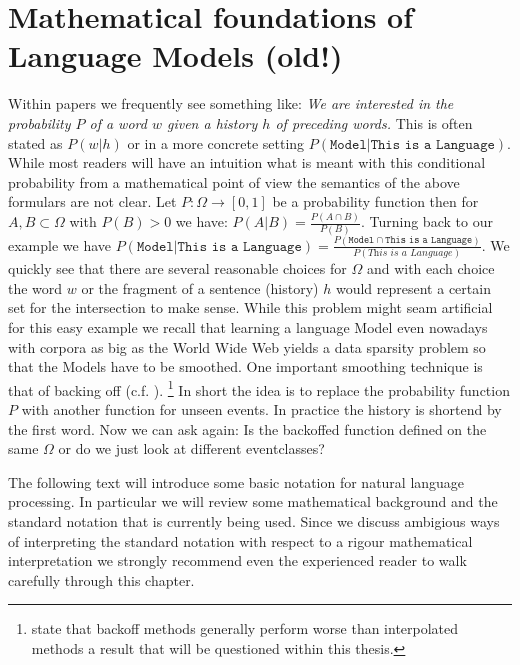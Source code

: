
\chapter{Mathematical foundations of Language Models (old!)}

Within papers we frequently see something like: \textit{We are interested in the probability $P$ of a word $w$ given a history $h$ of preceding words.}
This is often stated as $P(w|h)$ or in a more concrete setting $P(\texttt{Model}|\texttt{This is a Language})$. 
While most readers will have an intuition what is meant with this conditional probability from a mathematical point of view the semantics of the above formulars are not clear.
Let $P:\Omega \rightarrow [0,1]$ be a probability function then for $A,B \subset \Omega$ with $P(B)>0$ we have: $P(A|B)=\frac{P(A\cap B)}{P(B)}$.
Turning back to our example we have $P(\texttt{Model}|\texttt{This is a Language}) = \frac{P(\texttt{Model}\cap\texttt{This is a Language})}{P(\textit{This is a Language})}$.
We quickly see that there are several reasonable choices for $\Omega$ and with each choice the word $w$ or the fragment of a sentence (history) $h$ would represent a certain set for the intersection to make sense.
While this problem might seam artificial for this easy example we recall that learning a language Model even nowadays with corpora as big as the World Wide Web yields a data sparsity problem so that the Models have to be smoothed. 
One important smoothing technique is that of backing off (c.f. \cite{katz}\cite{kneser:ney:1994}). \footnote{\cite{chen:goodman} state that backoff methods generally perform worse than interpolated methods a result that will be questioned within this thesis.}
In short the idea is to replace the probability function $P$ with another function for unseen events. 
In practice the history is shortend by the first word. 
Now we can ask again: Is the backoffed function defined on the same $\Omega$ or do we just look at different eventclasses?

The following text will introduce some basic notation for natural language processing. 
In particular we will review some mathematical background and the standard notation that is currently being used.
Since we discuss ambigious ways of interpreting the standard notation with respect to a rigour mathematical interpretation  we strongly recommend even the experienced reader to walk carefully through this chapter. 
